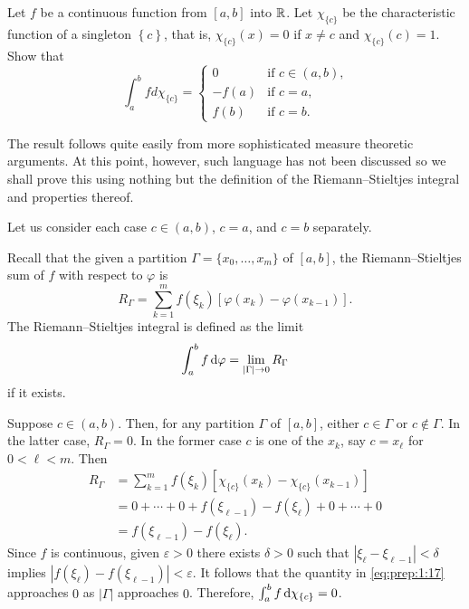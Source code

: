 \begin{problem}
  Let $f$ be a continuous function from $[a,b]$ into $\mathbb{R}$. Let
  $\chi_{\{c\}}$ be the characteristic function of a singleton
  $\left\{c\right\}$, that is, $\chi_{\{c\}}(x)=0$ if $x\neq c$ and
  $\chi_{\{c\}}(c)=1$. Show that
  \[
    \int_a^b f d \chi_{\{c\}}=
    \begin{cases}
      0&\text{if $c\in(a,b)$,}\\
      -f(a)&\text{if $c=a$,}\\
      f(b)&\text{if $c=b$.}
    \end{cases}
  \]
\end{problem}
\begin{solution}
  The result follows quite easily from more sophisticated measure theoretic
  arguments. At this point, however, such language has not been discussed
  so we shall prove this using nothing but the definition of the
  Riemann--Stieltjes integral and properties thereof.

  Let us consider each case $c\in(a,b)$, $c=a$, and $c=b$ separately.

  Recall that the given a partition $\Gamma=\{x_0,\dotsc,x_m\}$ of $[a,b]$,
  the Riemann--Stieltjes sum of $f$ with respect to $\varphi$ is
  \begin{equation}
    \label{eq:prep:1:15}
    R_\Gamma=\sum_{k=1}^mf(\xi_k)[\varphi(x_k)-\varphi(x_{k-1})].
  \end{equation}
  The Riemann--Stieltjes integral is defined as the limit
  \begin{equation}
    \label{eq:prep:1:16}
    \int_a^b f\mathop{}\!\mathrm{d}\varphi=\lim_{|\Gamma|\to 0} R_\Gamma
  \end{equation}
  if it exists.

  Suppose $c\in(a,b)$. Then, for any partition $\Gamma$ of $[a,b]$, either
  $c\in\Gamma$ or $c\notin\Gamma$. In the latter case, $R_\Gamma=0$. In the
  former case $c$ is one of the $x_k$, say $c=x_\ell$ for $0<\ell<m$. Then
  \begin{equation}
    \label{eq:prep:1:17}
    \begin{aligned}
      R_\Gamma&=\sum_{k=1}^mf(\xi_k)[\chi_{\{c\}}(x_k)-\chi_{\{c\}}(x_{k-1})]\\
      &=0+\dotsb+0+f(\xi_{\ell-1})-f(\xi_\ell)+0+\dotsb+0\\
      &=f(\xi_{\ell-1})-f(\xi_\ell).
    \end{aligned}
  \end{equation}
  Since $f$ is continuous, given $\varepsilon>0$ there exists $\delta>0$
  such that $|\xi_\ell-\xi_{\ell-1}|<\delta$ implies
  $|f(\xi_{\ell})-f(\xi_{\ell-1})|<\varepsilon$. It follows that the
  quantity in \eqref{eq:prep:1:17} approaches $0$ as $|\Gamma|$ approaches
  $0$. Therefore, $\int_a^b f\mathop{}\!\mathrm{d}\chi_{\{c\}}=0$.


\end{solution}
